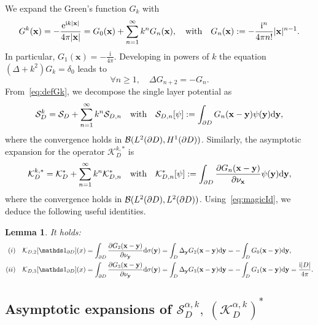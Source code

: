 \documentclass[11pt]{article}
\numberwithin{equation}{section}
\newtheorem{lem}{Lemma}[section]
\def\bx{{\mathbf{x}}}
\def\by{{\mathbf{y}}}
\def\rd{{\mathrm{d}}}
\def\re{{\mathrm{e}}}
\def\ri{{\mathrm{i}}}
\def\cS{{\mathcal{S}}}
\def\cK{{\mathcal{K}}}
\newcommand\1{{\ensuremath {\mathds 1} }}
\begin{document}
{{We expand the Green's function $G_k$ with
\begin{equation} \label{eq:defGk}
	G^k(\bx) = - \f{ \re^{ \ri k|\bx|}}{4 \pi | \bx |} = G_0(\bx) + \sum_{n=1}^\infty k^n G_n(\bx), \quad \text{with} \quad G_n(\bx) := - \frac{\ri^{n}}{4 \pi n!} | \bx |^{n-1}.
\end{equation}
In particular, $G_1(\bx) = -\frac{\ri}{4 \pi}$. Developing in powers of $k$ the equation $(\Delta + k^2) G_k = \delta_0$ leads to
\begin{equation} \label{eq:magicId}
	\forall n \ge 1, \quad \Delta G_{n+2} = - G_n.
\end{equation}
From~\eqref{eq:defGk}, we decompose the single layer potential as
\begin{equation} \label{series-s}
\mathcal{S}_{D}^{k} =  \cS_D + \sum_{n=1}^\infty k^n \cS_{D,n} \quad \text{with} \quad \cS_{D,n}[\psi] := \int_{\p D} G_n(\bx - \by) \psi(\by) \rd \by,
\end{equation}
where the convergence holds in $\mathcal{B}(L^2(\partial D), H^1(\partial D))$. Similarly, the asymptotic expansion for the operator $\mathcal{K}_{D}^{k, *}$ is
\begin{equation} \label{series-k}
\mathcal{K}_{D}^{k, *} = \cK_D^* + \sum_{n=1}^\infty k^n \cK_{D,n}^* \quad \text{with} \quad \cK_{D,n}^*[\psi] := \int_{\p D} \dfrac{ \p G_n(\bx - \by)}{\p \nu_\bx} \psi(\by) \rd \by,
\end{equation}
where the convergence holds in $\mathcal{B}(L^2(\partial D), L^2(\partial D))$. Using~\eqref{eq:magicId}, we deduce the following useful identities.
\begin{lem} \label{lem:magicId_3d}
It holds: 
\begin{align*}
(i) & \quad \mathcal{K}_{D, 2}[\1_{\p D}] (x) = \int_{\p D}  \dfrac{ \p G_2(\bx - \by)}{\p \nu_\by} \rd \sigma(\by) = \int_{D}  \Delta_\by G_2(\bx - \by) \rd \by = - \int_D G_0(\bx - \by) \rd \by, \\
(ii) & \quad \mathcal{K}_{D, 3}[\1_{\p D}](x) = \int_{\p D}  \dfrac{ \p G_3(\bx - \by)}{\p \nu_\by} \rd \sigma(\by) = \int_{D}  \Delta_\by G_3(\bx - \by) \rd \by = - \int_D G_1(\bx - \by) \rd \by = \frac{\ri | D |}{4 \pi}.
\end{align*}
\end{lem}


\subsection{Asymptotic expansions of $\mathcal{S}_{D}^{\alpha,k}, ~(\mathcal{K}_{D}^{\alpha, k})^ *$}

}}
\end{document}
